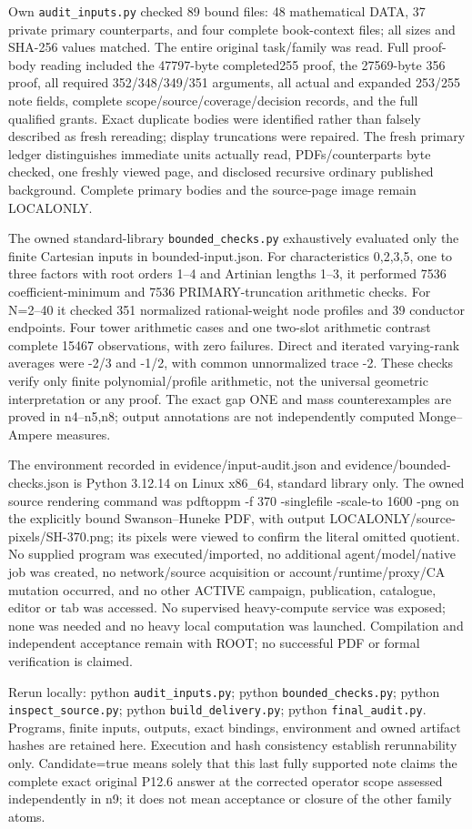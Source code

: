 Own \texttt{audit\_inputs.py} checked 89 bound files: 48 mathematical DATA, 37 private primary counterparts, and four complete book-context files; all sizes and SHA-256 values matched. The entire original task/family was read. Full proof-body reading included the 47797-byte completed255 proof, the 27569-byte 356 proof, all required 352/348/349/351 arguments, all actual and expanded 253/255 note fields, complete scope/source/coverage/decision records, and the full qualified grants. Exact duplicate bodies were identified rather than falsely described as fresh rereading; display truncations were repaired. The fresh primary ledger distinguishes immediate units actually read, PDFs/counterparts byte checked, one freshly viewed page, and disclosed recursive ordinary published background. Complete primary bodies and the source-page image remain LOCALONLY.

The owned standard-library \texttt{bounded\_checks.py} exhaustively evaluated only the finite Cartesian inputs in bounded-input.json. For characteristics 0,2,3,5, one to three factors with root orders 1--4 and Artinian lengths 1--3, it performed 7536 coefficient-minimum and 7536 PRIMARY-truncation arithmetic checks. For N=2--40 it checked 351 normalized rational-weight node profiles and 39 conductor endpoints. Four tower arithmetic cases and one two-slot arithmetic contrast complete 15467 observations, with zero failures. Direct and iterated varying-rank averages were -2/3 and -1/2, with common unnormalized trace -2. These checks verify only finite polynomial/profile arithmetic, not the universal geometric interpretation or any proof. The exact gap ONE and mass counterexamples are proved in n4--n5,n8; output annotations are not independently computed Monge--Ampere measures.

The environment recorded in evidence/input-audit.json and evidence/bounded-checks.json is Python 3.12.14 on Linux x86_64, standard library only. The owned source rendering command was pdftoppm -f 370 -singlefile -scale-to 1600 -png on the explicitly bound Swanson--Huneke PDF, with output LOCALONLY/source-pixels/SH-370.png; its pixels were viewed to confirm the literal omitted quotient. No supplied program was executed/imported, no additional agent/model/native job was created, no network/source acquisition or account/runtime/proxy/CA mutation occurred, and no other ACTIVE campaign, publication, catalogue, editor or tab was accessed. No supervised heavy-compute service was exposed; none was needed and no heavy local computation was launched. Compilation and independent acceptance remain with ROOT; no successful PDF or formal verification is claimed.

Rerun locally: python \texttt{audit\_inputs.py}; python \texttt{bounded\_checks.py}; python \texttt{inspect\_source.py}; python \texttt{build\_delivery.py}; python \texttt{final\_audit.py}. Programs, finite inputs, outputs, exact bindings, environment and owned artifact hashes are retained here. Execution and hash consistency establish rerunnability only. Candidate=true means solely that this last fully supported note claims the complete exact original P12.6 answer at the corrected operator scope assessed independently in n9; it does not mean acceptance or closure of the other family atoms.
